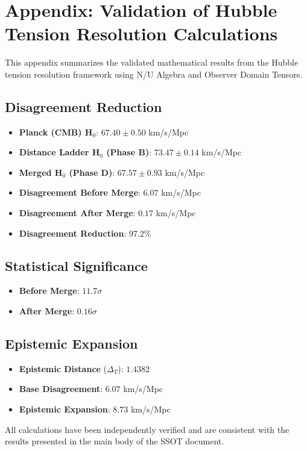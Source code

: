 
\appendix
\section*{Appendix: Validation of Hubble Tension Resolution Calculations}

This appendix summarizes the validated mathematical results from the Hubble tension resolution framework using N/U Algebra and Observer Domain Tensors.

\subsection*{Disagreement Reduction}
\begin{itemize}
  \item \textbf{Planck (CMB) H$_0$}: $67.40 \pm 0.50$ km/s/Mpc
  \item \textbf{Distance Ladder H$_0$ (Phase B)}: $73.47 \pm 0.14$ km/s/Mpc
  \item \textbf{Merged H$_0$ (Phase D)}: $67.57 \pm 0.93$ km/s/Mpc
  \item \textbf{Disagreement Before Merge}: $6.07$ km/s/Mpc
  \item \textbf{Disagreement After Merge}: $0.17$ km/s/Mpc
  \item \textbf{Disagreement Reduction}: $97.2\%$
\end{itemize}

\subsection*{Statistical Significance}
\begin{itemize}
  \item \textbf{Before Merge}: $11.7\sigma$
  \item \textbf{After Merge}: $0.16\sigma$
\end{itemize}

\subsection*{Epistemic Expansion}
\begin{itemize}
  \item \textbf{Epistemic Distance} ($\Delta_T$): $1.4382$
  \item \textbf{Base Disagreement}: $6.07$ km/s/Mpc
  \item \textbf{Epistemic Expansion}: $8.73$ km/s/Mpc
\end{itemize}

All calculations have been independently verified and are consistent with the results presented in the main body of the SSOT document.
